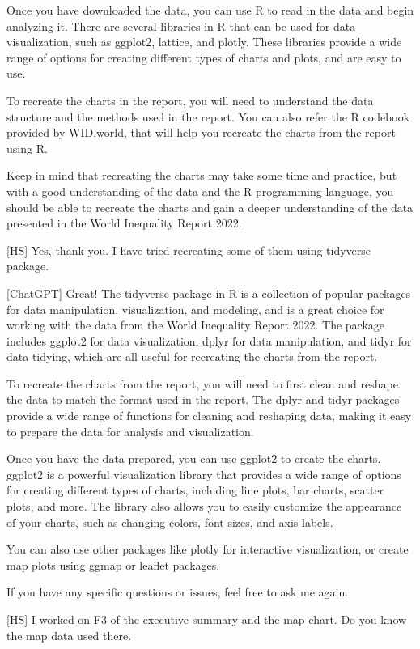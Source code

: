 \documentclass[
]{book}
\theoremstyle{definition}
\theoremstyle{definition}
\theoremstyle{definition}
\theoremstyle{definition}
\theoremstyle{remark}
\begin{document}
Once you have downloaded the data, you can use R to read in the data and begin analyzing it. There are several libraries in R that can be used for data visualization, such as ggplot2, lattice, and plotly. These libraries provide a wide range of options for creating different types of charts and plots, and are easy to use.

To recreate the charts in the report, you will need to understand the data structure and the methods used in the report. You can also refer the R codebook provided by WID.world, that will help you recreate the charts from the report using R.

Keep in mind that recreating the charts may take some time and practice, but with a good understanding of the data and the R programming language, you should be able to recreate the charts and gain a deeper understanding of the data presented in the World Inequality Report 2022.

{[}HS{]} Yes, thank you. I have tried recreating some of them using tidyverse package.

{[}ChatGPT{]} Great! The tidyverse package in R is a collection of popular packages for data manipulation, visualization, and modeling, and is a great choice for working with the data from the World Inequality Report 2022. The package includes ggplot2 for data visualization, dplyr for data manipulation, and tidyr for data tidying, which are all useful for recreating the charts from the report.

To recreate the charts from the report, you will need to first clean and reshape the data to match the format used in the report. The dplyr and tidyr packages provide a wide range of functions for cleaning and reshaping data, making it easy to prepare the data for analysis and visualization.

Once you have the data prepared, you can use ggplot2 to create the charts. ggplot2 is a powerful visualization library that provides a wide range of options for creating different types of charts, including line plots, bar charts, scatter plots, and more. The library also allows you to easily customize the appearance of your charts, such as changing colors, font sizes, and axis labels.

You can also use other packages like plotly for interactive visualization, or create map plots using ggmap or leaflet packages.

If you have any specific questions or issues, feel free to ask me again.

{[}HS{]} I worked on F3 of the executive summary and the map chart. Do you know the map data used there.
\end{document}
